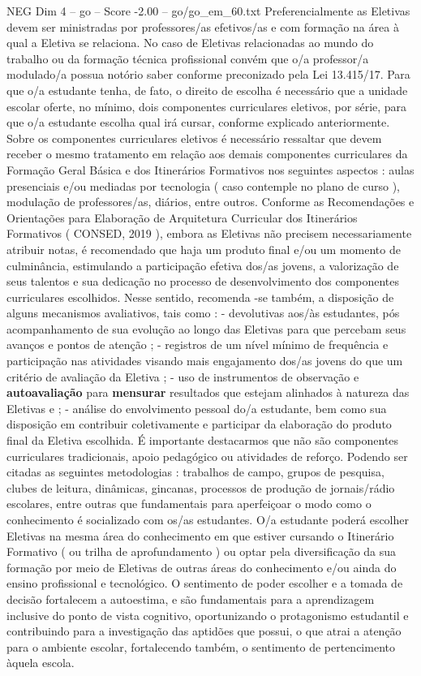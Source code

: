 \begin{textsample}{NEG Dim 4 – go – Score -2.00 – go/go\_em\_60.txt}
Preferencialmente as Eletivas devem ser ministradas por professores/as efetivos/as e com formação na área à qual a Eletiva se relaciona.
No caso de Eletivas relacionadas ao mundo do trabalho ou da formação técnica profissional convém que o/a professor/a modulado/a possua notório saber conforme preconizado pela Lei 13.415/17.
Para que o/a estudante tenha, de fato, o direito de escolha é necessário que a unidade escolar oferte, no mínimo, dois componentes curriculares eletivos, por série, para que o/a estudante escolha qual irá cursar, conforme explicado anteriormente.
Sobre os componentes curriculares eletivos é necessário ressaltar que devem receber o mesmo tratamento em relação aos demais componentes curriculares da Formação Geral Básica e dos Itinerários Formativos nos seguintes aspectos : aulas presenciais e/ou mediadas por tecnologia ( caso contemple no plano de curso ), modulação de professores/as, diários, entre outros.
Conforme as Recomendações e Orientações para Elaboração de Arquitetura Curricular dos Itinerários Formativos ( CONSED, 2019 ), embora as Eletivas não precisem necessariamente atribuir notas, é recomendado que haja um produto final e/ou um momento de culminância, estimulando a participação efetiva dos/as jovens, a valorização de seus talentos e sua dedicação no processo de desenvolvimento dos componentes curriculares escolhidos.
Nesse sentido, recomenda -se também, a disposição de alguns mecanismos avaliativos, tais como : - devolutivas aos/às estudantes, pós acompanhamento de sua evolução ao longo das Eletivas para que percebam seus avanços e pontos de atenção ; - registros de um nível mínimo de frequência e participação nas atividades visando mais engajamento dos/as jovens do que um critério de avaliação da Eletiva ; - uso de instrumentos de observação e \textbf{autoavaliação} para \textbf{mensurar} resultados que estejam alinhados à natureza das Eletivas e ; - análise do envolvimento pessoal do/a estudante, bem como sua disposição em contribuir coletivamente e participar da elaboração do produto final da Eletiva escolhida.
É importante destacarmos que não são componentes curriculares tradicionais, apoio pedagógico ou atividades de reforço.
Podendo ser citadas as seguintes metodologias : trabalhos de campo, grupos de pesquisa, clubes de leitura, dinâmicas, gincanas, processos de produção de jornais/rádio escolares, entre outras que fundamentais para aperfeiçoar o modo como o conhecimento é socializado com os/as estudantes.
O/a estudante poderá escolher Eletivas na mesma área do conhecimento em que estiver cursando o Itinerário Formativo ( ou trilha de aprofundamento ) ou optar pela diversificação da sua formação por meio de Eletivas de outras áreas do conhecimento e/ou ainda do ensino profissional e tecnológico.
O sentimento de poder escolher e a tomada de decisão fortalecem a autoestima, e são fundamentais para a aprendizagem inclusive do ponto de vista cognitivo, oportunizando o protagonismo estudantil e contribuindo para a investigação das aptidões que possui, o que atrai a atenção para o ambiente escolar, fortalecendo também, o sentimento de pertencimento àquela escola.

\end{textsample}
